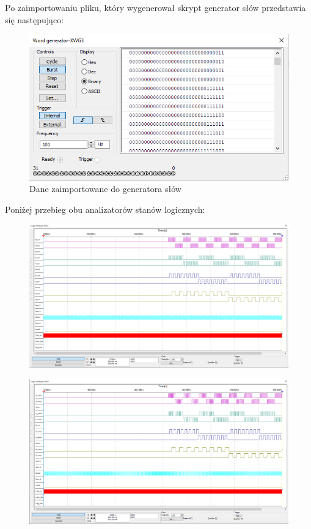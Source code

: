 \documentclass[a4paper]{article}
\begin{document}
\pagebreak
Po zaimportowaniu pliku, który wygenerował skrypt generator słów przedstawia się następująco:
\begin{figure}[H]
    \centering

    \includegraphics{setter_test_word_generator.png}
    \caption{Dane zaimportowane do generatora słów}
\end{figure}

\pagebreak
Poniżej przebieg obu analizatorów stanów logicznych:
\begin{figure}[H]
    \centering
    \includegraphics[width=\textwidth]{component_test_logic_analyzer_xla2_setter.png}
\end{figure}

\begin{figure}[H]
    \centering
    \includegraphics[width=\textwidth]{component_test_logic_analyzer_xla3_setter.png}
\end{figure}
\end{document}
